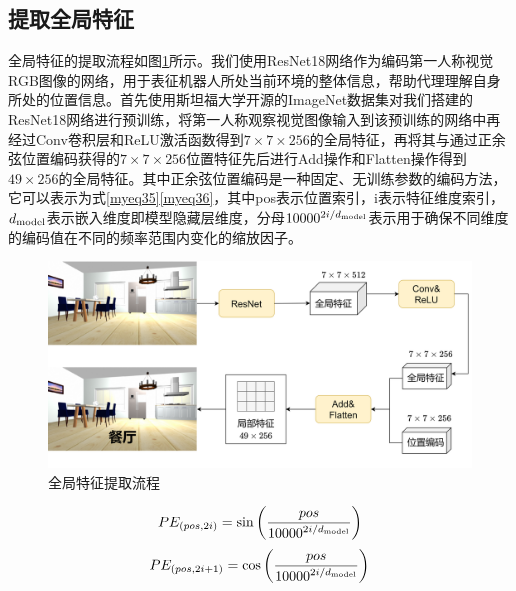 \subsection{提取全局特征}
全局特征的提取流程如图\ref{全局特征提取}所示。我们使用ResNet18网络作为编码第一人称视觉RGB图像的网络，用于表征机器人所处当前环境的整体信息，帮助代理理解自身所处的位置信息。首先使用斯坦福大学开源的ImageNet数据集对我们搭建的ResNet18网络进行预训练，将第一人称观察视觉图像输入到该预训练的网络中再经过Conv卷积层和ReLU激活函数得到$7 \times 7 \times 256$的全局特征，再将其与通过正余弦位置编码获得的$7 \times 7 \times 256$位置特征先后进行Add操作和Flatten操作得到$49 \times 256$的全局特征。其中正余弦位置编码是一种固定、无训练参数的编码方法，它可以表示为式\ref{myeq35}\ref{myeq36}，其中pos表示位置索引，i表示特征维度索引，$d_{{\rm{model}}}$表示嵌入维度即模型隐藏层维度，分母${10000^{{{2i} \mathord{\left/
 {\vphantom {{2i} {{d_{{\rm{model}}}}}}} \right.
 \kern-\nulldelimiterspace} {{d_{{\rm{model}}}}}}}}$表示用于确保不同维度的编码值在不同的频率范围内变化的缩放因子。
\begin{figure}[htbp]
    \centering
    \includegraphics[scale=0.09]{Fig/全局特征提取.png}
    \caption{\label{全局特征提取}全局特征提取流程}
\end{figure}

\begin{equation}
    P{E_{\left( {pos,2i} \right)}} = \sin \left( {\frac{{pos}}{{{{10000}^{{{2i} \mathord{\left/
 {\vphantom {{2i} {{d_{{\rm{model}}}}}}} \right.
 \kern-\nulldelimiterspace} {{d_{{\rm{model}}}}}}}}}}} \right)
    \label{myeq35}
\end{equation}
\begin{equation}
    P{E_{\left( {pos,2i + 1} \right)}} = \cos \left( {\frac{{pos}}{{{{10000}^{{{2i} \mathord{\left/
 {\vphantom {{2i} {{d_{{\rm{model}}}}}}} \right.
 \kern-\nulldelimiterspace} {{d_{{\rm{model}}}}}}}}}}} \right)
    \label{myeq36}
\end{equation}

